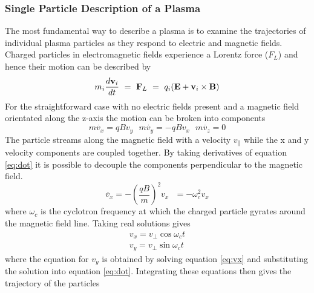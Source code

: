 \subsubsection{Single Particle Description of a Plasma}
The most fundamental way to describe a plasma is to examine the trajectories of individual plasma particles as they respond to electric and magnetic fields. Charged particles in electromagnetic fields experience a Lorentz force ($F_L$) and hence their motion can be described by
\begin{equation}
m_i \frac{d \bold{v}_i}{dt} \  = \ \bold{F}_L \ = \ q_i (\bold{E} + \bold{v}_i \times \bold{B})
\label{eq:force}
\end{equation}
For the straightforward case with no electric fields present and a magnetic field orientated along the z-axis the motion can be broken into components
\begin{equation}
m \dot{v_x} = q B v_y \ \ \ m \dot{v_y} = - q B v_x \ \ \ m \dot{v_z} = 0
\label{eq:dot}
\end{equation}
The particle streams along the magnetic field with a velocity $ v_{\parallel} $ while the x and y velocity components are coupled together. By taking derivatives of equation \ref{eq:dot} it is possible to decouple the components perpendicular to the magnetic field. 
\begin{equation}
\ddot{v_x}  =   - {\left(\frac{qB}{m}\right)}^2 v_x  \ \ \   =   - \omega_c^2 v_x  
\label{eq:vx}
\end{equation}
where $\omega_c$ is the cyclotron frequency at which the charged particle gyrates around the magnetic field line. Taking real solutions gives
\begin{equation}
\begin{split}
v_x = v_\perp \cos\omega_c t  \\
v_y = v_\perp \sin\omega_c t
\end{split}
\end{equation}
where the equation for $v_y$ is obtained by solving equation \ref{eq:vx} and substituting the solution into equation \ref{eq:dot}. Integrating these equations then gives the trajectory of the particles 

